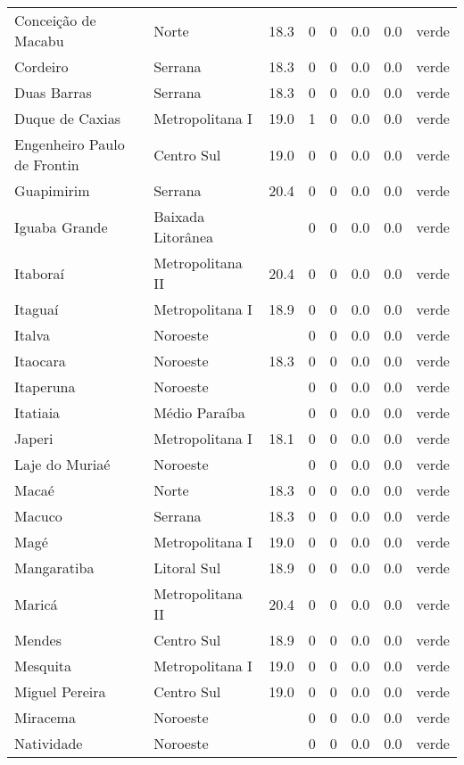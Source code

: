 \begin{longtable}{l|lllllll}
  Conceição de Macabu & Norte & 18.3 & 0 & 0 & 0.0 & 0.0 & verde \\ 
  Cordeiro & Serrana & 18.3 & 0 & 0 & 0.0 & 0.0 & verde \\ 
  Duas Barras & Serrana & 18.3 & 0 & 0 & 0.0 & 0.0 & verde \\ 
  Duque de Caxias & Metropolitana I & 19.0 & 1 & 0 & 0.0 & 0.0 & verde \\ 
  Engenheiro Paulo de Frontin & Centro Sul & 19.0 & 0 & 0 & 0.0 & 0.0 & verde \\ 
  Guapimirim & Serrana & 20.4 & 0 & 0 & 0.0 & 0.0 & verde \\ 
  Iguaba Grande & Baixada Litorânea &  & 0 & 0 & 0.0 & 0.0 & verde \\ 
  Itaboraí & Metropolitana II & 20.4 & 0 & 0 & 0.0 & 0.0 & verde \\ 
  Itaguaí & Metropolitana I & 18.9 & 0 & 0 & 0.0 & 0.0 & verde \\ 
  Italva & Noroeste &  & 0 & 0 & 0.0 & 0.0 & verde \\ 
  Itaocara & Noroeste & 18.3 & 0 & 0 & 0.0 & 0.0 & verde \\ 
  Itaperuna & Noroeste &  & 0 & 0 & 0.0 & 0.0 & verde \\ 
  Itatiaia & Médio Paraíba &  & 0 & 0 & 0.0 & 0.0 & verde \\ 
  Japeri & Metropolitana I & 18.1 & 0 & 0 & 0.0 & 0.0 & verde \\ 
  Laje do Muriaé & Noroeste &  & 0 & 0 & 0.0 & 0.0 & verde \\ 
  Macaé & Norte & 18.3 & 0 & 0 & 0.0 & 0.0 & verde \\ 
  Macuco & Serrana & 18.3 & 0 & 0 & 0.0 & 0.0 & verde \\ 
  Magé & Metropolitana I & 19.0 & 0 & 0 & 0.0 & 0.0 & verde \\ 
  Mangaratiba & Litoral Sul & 18.9 & 0 & 0 & 0.0 & 0.0 & verde \\ 
  Maricá & Metropolitana II & 20.4 & 0 & 0 & 0.0 & 0.0 & verde \\ 
  Mendes & Centro Sul & 18.9 & 0 & 0 & 0.0 & 0.0 & verde \\ 
  Mesquita & Metropolitana I & 19.0 & 0 & 0 & 0.0 & 0.0 & verde \\ 
  Miguel Pereira & Centro Sul & 19.0 & 0 & 0 & 0.0 & 0.0 & verde \\ 
  Miracema & Noroeste &  & 0 & 0 & 0.0 & 0.0 & verde \\ 
  Natividade & Noroeste &  & 0 & 0 & 0.0 & 0.0 & verde \\ 

\end{longtable}
